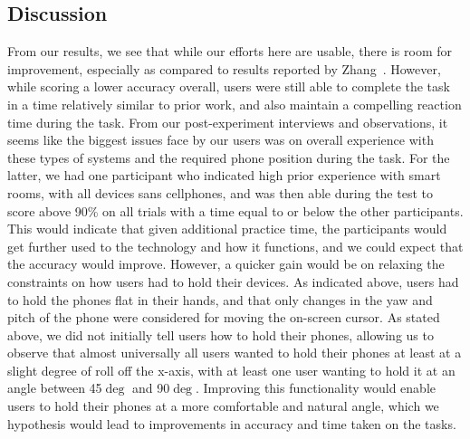 \subsection{Discussion}

From our results, we see that while our efforts here are usable, there is
room for improvement, especially as compared to results reported by
Zhang~\cite{zhang_combining_2017}. However, while scoring a lower accuracy
overall, users were still able to complete the task in a time relatively
similar to prior work, and also maintain a compelling reaction time during the
task. From our post-experiment interviews and observations, it seems like the
biggest issues face by our users was on overall experience with these types of 
systems and the required phone position during the task. For the latter,
we had one participant who indicated high prior experience with smart rooms,
with all devices sans cellphones, and was then able during the test to score
above 90\% on all trials with a time equal to or below the other participants.
This would indicate that given additional practice time, the participants would
get further used to the technology and how it functions, and we could expect that
the accuracy would improve. However, a quicker gain would be on relaxing the
constraints on how users had to hold their devices. As indicated above, users
had to hold the phones flat in their hands, and that only changes in the yaw
and pitch of the phone were considered for moving the on-screen cursor. As stated
above, we did not initially tell users how to hold their phones, allowing us to
observe that almost universally all users wanted to hold their phones at least at
a slight degree of roll off the x-axis, with at least one user wanting to hold it
at an angle between 45$\deg$ and 90$\deg$. Improving this functionality would
enable users to hold their phones at a more comfortable and natural angle, which
we hypothesis would lead to improvements in accuracy and time taken on the tasks.
